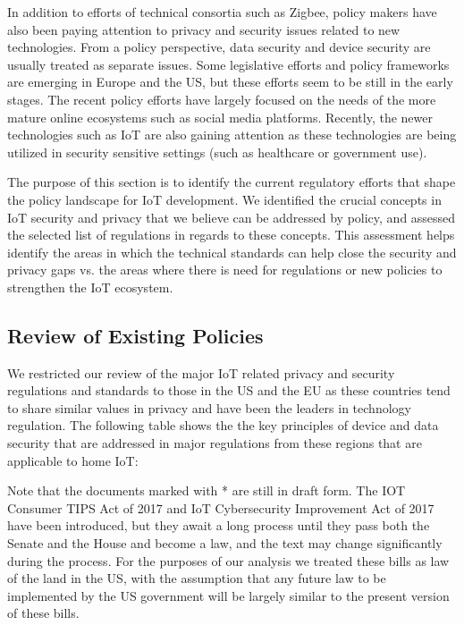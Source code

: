 In addition to efforts of technical consortia such as Zigbee, policy makers have also been paying attention to privacy and security issues related to new technologies. From a policy perspective, data security and device security are usually treated as separate issues. Some legislative efforts and policy frameworks are emerging in Europe and the US, but these efforts seem to be still in the early stages. The recent policy efforts have largely focused on the needs of the more mature online ecosystems such as social media platforms. Recently, the newer technologies such as IoT are also gaining attention as these technologies are being utilized in security sensitive settings (such as healthcare or government use).

The purpose of this section is to identify the current regulatory efforts that shape the policy landscape for IoT development. We identified the crucial concepts in IoT security and privacy that we believe can be addressed by policy, and assessed the selected list of regulations in regards to these concepts. This assessment helps identify the areas in which the technical standards can help close the security and privacy gaps vs. the areas where there is need for regulations or new policies to strengthen the IoT ecosystem.

\subsection{Review of Existing Policies}

We restricted our review of the major IoT related privacy and security regulations and standards to those in the US and the EU as these countries tend to share similar values in privacy and have been the leaders in technology regulation. The following table shows the the key principles of device and data security that are addressed in major regulations from these regions that are applicable to home IoT:

%
%

Note that the documents marked with * are still in draft form. The IOT Consumer TIPS Act of 2017 and IoT Cybersecurity Improvement Act of 2017 have been introduced, but they await a long process until they pass both the Senate and the House and become a law, and the text may change significantly during the process. For the purposes of our analysis we treated these bills as law of the land in the US, with the assumption that any future law to be implemented by the US government will be largely similar to the present version of these bills.

